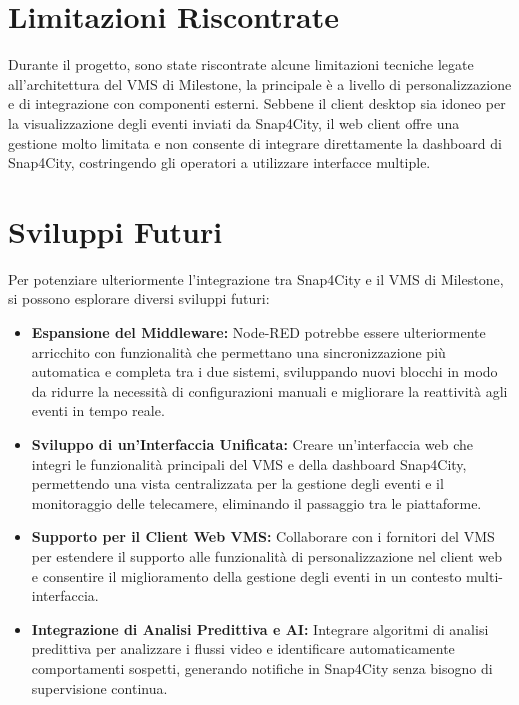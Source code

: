 \documentclass[a4paper, openright, thesis]{report}
\newcommand\blankpage{%
    \null
    \thispagestyle{empty}%
    \addtocounter{page}{-1}%
    \newpage}
\begin{document}
\section{Limitazioni Riscontrate}
Durante il progetto, sono state riscontrate alcune limitazioni tecniche legate all'architettura del VMS di Milestone, la principale è a livello di personalizzazione e di integrazione con componenti esterni. Sebbene il client desktop sia idoneo per la visualizzazione degli eventi inviati da Snap4City, il web client offre una gestione molto limitata e non consente di integrare direttamente la dashboard di Snap4City, costringendo gli operatori a utilizzare interfacce multiple.
\section{Sviluppi Futuri}
Per potenziare ulteriormente l'integrazione tra Snap4City e il VMS di Milestone, si possono esplorare diversi sviluppi futuri:
\begin{itemize}
    \item \textbf{Espansione del Middleware:} Node-RED potrebbe essere ulteriormente arricchito con funzionalità che permettano una sincronizzazione più automatica e completa tra i due sistemi, sviluppando nuovi blocchi in modo da ridurre la necessità di configurazioni manuali e migliorare la reattività agli eventi in tempo reale.
    \item \textbf{Sviluppo di un’Interfaccia Unificata:} Creare un’interfaccia web che integri le funzionalità principali del VMS e della dashboard Snap4City, permettendo una vista centralizzata per la gestione degli eventi e il monitoraggio delle telecamere, eliminando il passaggio tra le piattaforme.
    \item  \textbf{Supporto per il Client Web VMS:} Collaborare con i fornitori del VMS per estendere il supporto alle funzionalità di personalizzazione nel client web e consentire il miglioramento della gestione degli eventi in un contesto multi-interfaccia.
    \item \textbf{Integrazione di Analisi Predittiva e AI:} Integrare algoritmi di analisi predittiva per analizzare i flussi video e identificare automaticamente comportamenti sospetti, generando notifiche in Snap4City senza bisogno di supervisione continua.
\end{itemize}


\afterpage{\blankpage}
\end{document}
